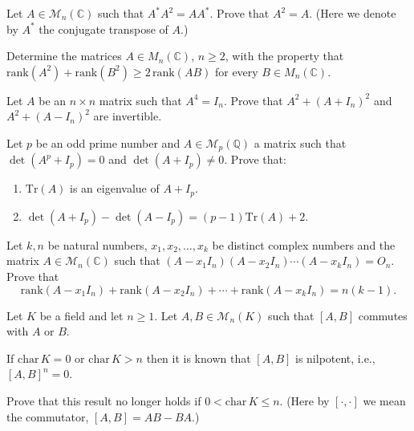 \documentclass[12pt]{article}
\begin{document}
\begin{problem}
Let $A \in \mathcal{M}_n(\mathbb{C})$ such that $A^*A^2 = AA^*$. Prove that $A^2 = A$. (Here we denote by $A^*$ the conjugate transpose of $A$.)
\end{problem}

\begin{problem}
Determine the matrices $A \in M_n(\mathbb{C})$, $n\geq 2$, with the property that $\mathrm{rank}(A^2) + \mathrm{rank}(B^2) \geq 2\,\mathrm{rank}(AB)$ for every $B \in M_n(\mathbb{C})$.
\end{problem}

\begin{problem}
Let $A$ be an $n\times n$ matrix such that $A^4 = I_n$. Prove that $A^2 + (A+I_n)^2$ and $A^2 + (A-I_n)^2$ are invertible.
\end{problem}

\begin{problem}
Let $p$ be an odd prime number and $A \in \mathcal{M}_p(\mathbb{Q})$ a matrix such that $\det(A^p + I_p) = 0$ and $\det(A + I_p) \neq 0$. Prove that:
\begin{enumerate}[label=(\alph*)]
\item $\mathrm{Tr}(A)$ is an eigenvalue of $A + I_p$.
\item $\det(A+I_p) - \det(A - I_p) = (p-1)\mathrm{Tr}(A) + 2$.
\end{enumerate}
\end{problem}

\begin{problem}
Let $k, n$ be natural numbers, $x_1, x_2, \ldots, x_k$ be distinct complex numbers and the matrix $A \in \mathcal{M}_n(\mathbb{C})$ such that $(A - x_1 I_n)(A - x_2 I_n) \cdots (A - x_k I_n) = O_n$. Prove that
\[
\mathrm{rank}(A - x_1 I_n) + \mathrm{rank}(A - x_2 I_n) + \cdots + \mathrm{rank}(A - x_k I_n) = n(k-1).
\]
\end{problem}

\begin{problem}
Let $K$ be a field and let $n \geq 1$. Let $A, B \in \mathcal{M}_n(K)$ such that $[A,B]$ commutes with $A$ or $B$.

If $\mathrm{char}\, K = 0$ or $\mathrm{char}\, K > n$ then it is known that $[A,B]$ is nilpotent, i.e., $[A,B]^n = 0$.

Prove that this result no longer holds if $0 < \mathrm{char}\, K \leq n$. (Here by $[\cdot,\cdot]$ we mean the commutator, $[A,B] = AB - BA$.)
\end{problem}
\end{document}
